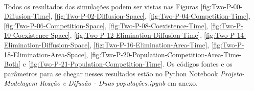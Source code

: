 \documentclass{article}
\begin{document}
	\paragraph{}
	Todos os resultados das simulações podem ser vistas nas Figuras \ref{fig:Two-P-00-Diffusion-Time}, \ref{fig:Two-P-02-Diffusion-Space}, \ref{fig:Two-P-04-Competition-Time}, \ref{fig:Two-P-06-Competition-Space}, \ref{fig:Two-P-08-Coexistence-Time}, \ref{fig:Two-P-10-Coexistence-Space}, \ref{fig:Two-P-12-Elimination-Diffusion-Time}, \ref{fig:Two-P-14-Elimination-Diffusion-Space}, \ref{fig:Two-P-16-Elimination-Area-Time}, \ref{fig:Two-P-18-Elimination-Area-Space}, \ref{fig:Two-P-20-Population-Competition-Area-Time-Both} e \ref{fig:Two-P-21-Population-Competition-Time}. Os códigos fontes e os parâmetros para se chegar nesses resultados estão no Python Notebook \textit{Projeto-Modelagem Reação e Difusão - Duas populações.ipynb} em anexo.
	
\end{document}
